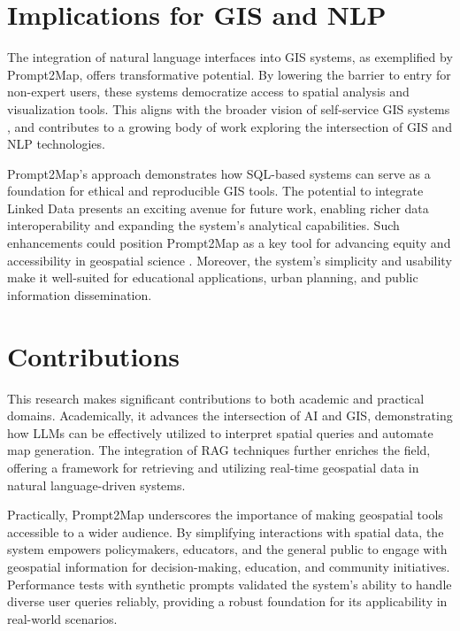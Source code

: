 \section{Implications for GIS and NLP}

The integration of natural language interfaces into GIS systems, as exemplified by Prompt2Map, offers transformative potential. By lowering the barrier to entry for non-expert users, these systems democratize access to spatial analysis and visualization tools. This aligns with the broader vision of self-service GIS systems \cite{rowland_towards_2020}, and contributes to a growing body of work exploring the intersection of GIS and NLP technologies.

Prompt2Map's approach demonstrates how SQL-based systems can serve as a foundation for ethical and reproducible GIS tools. The potential to integrate Linked Data presents an exciting avenue for future work, enabling richer data interoperability and expanding the system's analytical capabilities. Such enhancements could position Prompt2Map as a key tool for advancing equity and accessibility in geospatial science \cite{wang_gpt_2024}. Moreover, the system's simplicity and usability make it well-suited for educational applications, urban planning, and public information dissemination.

\section{Contributions}

This research makes significant contributions to both academic and practical domains. Academically, it advances the intersection of AI and GIS, demonstrating how LLMs can be effectively utilized to interpret spatial queries and automate map generation. The integration of RAG techniques further enriches the field, offering a framework for retrieving and utilizing real-time geospatial data in natural language-driven systems.

Practically, Prompt2Map underscores the importance of making geospatial tools accessible to a wider audience. By simplifying interactions with spatial data, the system empowers policymakers, educators, and the general public to engage with geospatial information for decision-making, education, and community initiatives. Performance tests with synthetic prompts validated the system's ability to handle diverse user queries reliably, providing a robust foundation for its applicability in real-world scenarios.

